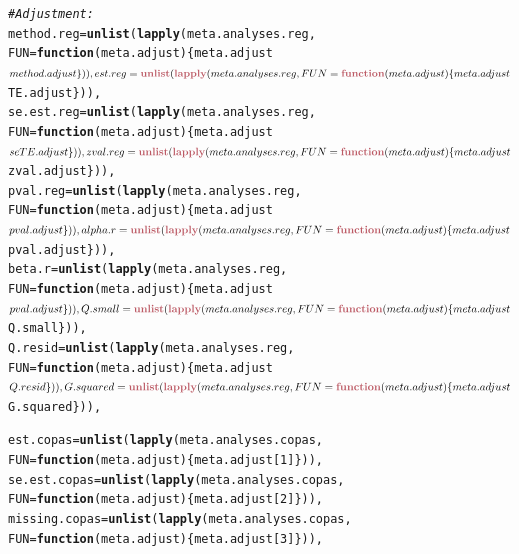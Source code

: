 \documentclass[11pt,a4paper,twoside]{book}\usepackage[]{graphicx}\usepackage[]{color}
\makeatletter
\newcommand{\hlcom}[1]{\textcolor[rgb]{0.678,0.584,0.686}{\textit{#1}}}%
\newcommand{\hlkwd}[1]{\textcolor[rgb]{0.737,0.353,0.396}{\textbf{#1}}}%
\newenvironment{kframe}{%
 \def\at@end@of@kframe{}%
 \ifinner\ifhmode%
  \def\at@end@of@kframe{\end{minipage}}%
  \begin{minipage}{\columnwidth}%
 \fi\fi%
 \def\FrameCommand##1{\hskip\@totalleftmargin \hskip-\fboxsep
 \colorbox{shadecolor}{##1}\hskip-\fboxsep
     \hskip-\linewidth \hskip-\@totalleftmargin \hskip\columnwidth}%
 \MakeFramed {\advance\hsize-\width
   \@totalleftmargin\z@ \linewidth\hsize
   \@setminipage}}%
 {\par\unskip\endMakeFramed%
 \at@end@of@kframe}
\newenvironment{knitrout}{}{} %
\makeatother
\begin{document}
\begin{knitrout}
\begin{kframe}
\begin{alltt}
\hlcom{  #Adjustment:}
  method.reg = \hlkwd{unlist}(\hlkwd{lapply}(meta.analyses.reg, 
                  FUN = \hlkwd{function}(meta.adjust)\{meta.adjust$method.adjust\})),
  est.reg = \hlkwd{unlist}(\hlkwd{lapply}(meta.analyses.reg, 
                  FUN = \hlkwd{function}(meta.adjust)\{meta.adjust$TE.adjust\})),
  se.est.reg = \hlkwd{unlist}(\hlkwd{lapply}(meta.analyses.reg, 
                  FUN = \hlkwd{function}(meta.adjust)\{meta.adjust$seTE.adjust\})),
  zval.reg = \hlkwd{unlist}(\hlkwd{lapply}(meta.analyses.reg, 
                  FUN = \hlkwd{function}(meta.adjust)\{meta.adjust$zval.adjust\})),
  pval.reg = \hlkwd{unlist}(\hlkwd{lapply}(meta.analyses.reg, 
                  FUN = \hlkwd{function}(meta.adjust)\{meta.adjust$pval.adjust\})),
  alpha.r = \hlkwd{unlist}(\hlkwd{lapply}(meta.analyses.reg, 
                  FUN = \hlkwd{function}(meta.adjust)\{meta.adjust$pval.adjust\})),
  beta.r = \hlkwd{unlist}(\hlkwd{lapply}(meta.analyses.reg, 
                  FUN = \hlkwd{function}(meta.adjust)\{meta.adjust$pval.adjust\})),
  Q.small = \hlkwd{unlist}(\hlkwd{lapply}(meta.analyses.reg, 
                  FUN = \hlkwd{function}(meta.adjust)\{meta.adjust$Q.small\})),
  Q.resid = \hlkwd{unlist}(\hlkwd{lapply}(meta.analyses.reg, 
                  FUN = \hlkwd{function}(meta.adjust)\{meta.adjust$Q.resid\})),
  G.squared = \hlkwd{unlist}(\hlkwd{lapply}(meta.analyses.reg, 
                  FUN = \hlkwd{function}(meta.adjust)\{meta.adjust$G.squared\})),
  
  est.copas = \hlkwd{unlist}(\hlkwd{lapply}(meta.analyses.copas, 
                  FUN = \hlkwd{function}(meta.adjust)\{meta.adjust[1]\})),
  se.est.copas = \hlkwd{unlist}(\hlkwd{lapply}(meta.analyses.copas, 
                  FUN = \hlkwd{function}(meta.adjust)\{meta.adjust[2]\})),
  missing.copas = \hlkwd{unlist}(\hlkwd{lapply}(meta.analyses.copas, 
                  FUN = \hlkwd{function}(meta.adjust)\{meta.adjust[3]\})),
  

\end{alltt}
\end{kframe}
\end{knitrout}
\end{document}
